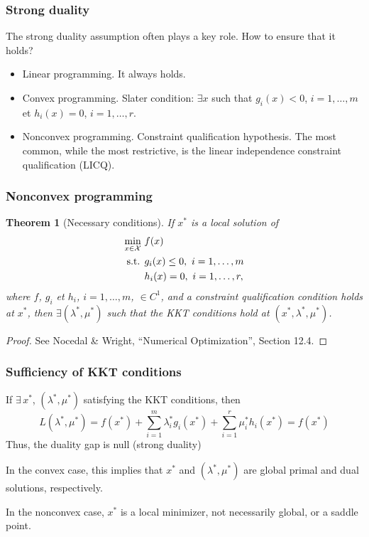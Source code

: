 \documentclass[usepdftitle=false]{beamer}
\newtheorem{thm}{Theorem}
\def\red{\color{red}}
\begin{document}
\begin{frame}
\frametitle{Strong duality}

\mbox{}

The strong duality assumption often plays a key role. How to ensure that it holds?
\begin{itemize}
\item
Linear programming. It always holds.
\item
Convex programming. Slater condition: $\exists x$ such that $g_i(x) < 0$, $i = 1,\ldots,m$ et $h_i(x) = 0$, $i = 1,\ldots,r$.
\item
Nonconvex programming. Constraint qualification hypothesis. The most common, while the most restrictive, is the linear independence constraint qualification (LICQ).
\end{itemize}

\end{frame}

\begin{frame}
\frametitle{Nonconvex programming}

\begin{thm}[Necessary conditions]
If $x^*$ is a local solution of
\begin{align*}
\min_{x \in {\mathcal{X}}} \ & f(x) \\
\mbox{s.t. } & g_i(x) \leq 0,\ i = 1,\ldots,m \\
& h_i(x) = 0,\ i = 1,\ldots,r,
\end{align*}
where $f$, $g_i$ et $h_i$, $i = 1,\ldots,m$, $\in C^1$, and a constraint qualification condition holds at $x^*$, then
$\exists (\lambda^*, \mu^*)$ such that the KKT conditions hold at $(x^*,\lambda^*, \mu^*)$.
\end{thm}

\begin{proof}
See Nocedal \& Wright, ``Numerical Optimization'', Section 12.4.
\end{proof}

\end{frame}

\begin{frame}
	\frametitle{Sufficiency of KKT conditions}
	
	If $\exists\, x^*$, $(\lambda^*, \mu^*)$ satisfying the KKT conditions, then
	$$
	L(\lambda^*, \mu^*) = f(x^*) + \sum_{i = 1}^m \lambda_i^* g_i(x^*) + \sum_{i = 1}^r \mu_i^* h_i(x^*) = f(x^*)
	$$
	Thus, the duality gap is null ({\red strong duality})
		
	\mbox{}
	
	In the convex case, this implies that $x^*$ and $(\lambda^*, \mu^*)$ are global primal and dual solutions, respectively.

	\mbox{}

	In the nonconvex case, $x^*$ is a local minimizer, not necessarily global, or a saddle point.
	
	
\end{frame}
\end{document}
